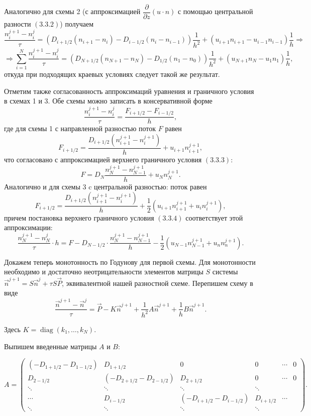 \documentclass[14pt, a4paper, fleqn]{extarticle}
\newcommand{\diag}{\operatorname{diag}}
\begin{document}
Аналогично для схемы 2 (с аппроксимацией $\dfrac{\partial}{\partial z}(u\cdot n)$ с помощью центральной разности $(3.3.2)$) получаем $$\dfrac{n_i^{j+1}-n_i^j}{\tau} = (D_{i+1/2}(n_{i+1}-n_i)-D_{i-1/2}(n_i-n_{i-1}))\dfrac{1}{h^2}+(u_{i+1}n_{i+1}-u_{i-1} n_{i-1})\dfrac{1}{h}\Rightarrow$$ $$\Rightarrow \displaystyle\sum_{i=1}^{N} \dfrac{n_i^{j+1}-n_i^j}{\tau} = (D_{N+1/2}(n_{N+1}-n_{N})-D_{1/2}(n_1-n_0))\dfrac{1}{h^2}+(u_{N+1}n_{N}-u_1 n_1)\dfrac{1}{h},$$ откуда при подходящих краевых условиях следует такой же результат.

\bigskip

Отметим также согласованность аппроксимаций уравнения и граничного условия в схемах 1 и 3. Обе схемы можно записать в консервативной форме $$\dfrac{n_i^{j+1}-n_i^j}{\tau} = \dfrac{F_{i+1/2}-F_{i-1/2}}{h},$$ где для схемы 1 с направленной разностью поток $F$ равен $$F_{i+1/2} = \dfrac{D_{i+1/2}(n_{i+1}^{j+1}-n_i^{j+1})}{h}+u_{i+1}n_{i+1}^{j+1},$$ что согласовано с аппроксимацией верхнего граничного условия $(3.3.3)$: $$F = D_N\dfrac{n_N^{j+1}-n_{N-1}^{j+1}}{h}+u_Nn_N^{j+1}.$$
Аналогично и для схемы 3 c центральной разностью: поток равен $$F_{i+1/2} = \dfrac{D_{i+1/2}(n_{i+1}^{j+1}-n_i^{j+1})}{h}+\dfrac{1}{2}(u_{i+1}n_{i+1}^{j+1}+u_in_i^{j+1}),$$ причем постановка верхнего граничного условия $(3.3.4)$ соответствует этой аппроксимации: $$\dfrac{n_N^{j+1}-n_N^{j}}{\tau}\cdot h = F - D_{N-1/2}\cdot\dfrac{n_N^{j+1}-n_{N-1}^{j+1}}{h}-\dfrac{1}{2}(u_{N-1}n_{N-1}^{j+1}+u_nn_n^{j+1}).$$

\bigskip

Докажем теперь монотонность по Годунову для первой схемы. Для монотонности необходимо и достаточно неотрицательности элементов матрицы $S$ системы $\vec{n}^{j+1}=S\vec{n}^j + \tau S\vec{P}$, эквивалентной нашей разностной схеме. Перепишем схему в виде $$\dfrac{\vec{n}^{j+1}-\vec{n}^j}{\tau}= \vec{P} - K\vec{n}^{j+1}+\dfrac{1}{h^2}A\vec{n}^{j+1}+\dfrac{1}{h}B\vec{n}^{j+1}.$$

Здесь $K = \diag(k_1,\dotsc, k_N)$.

Выпишем введенные матрицы $A$ и $B$:

$$A = \left(\begin{smallmatrix}
(-D_{1+1/2}-D_{1-1/2}) & D_{1+1/2}             & 0        & 0  & \cdots & 0 \\
D_{2-1/2}              & (-D_{2+1/2}-D_{2-1/2}) & D_{2+1/2} & 0  & \cdots & 0 \\         
\ddots & \ddots & \ddots & \ddots \\
\cdots & D_{i-1/2} & (-D_{i+1/2}-D_{i-1/2}) & D_{i+1/2} &  \cdots &  \\
\ddots & \ddots & \ddots & \ddots
\end{smallmatrix}\right).$$
\end{document}
